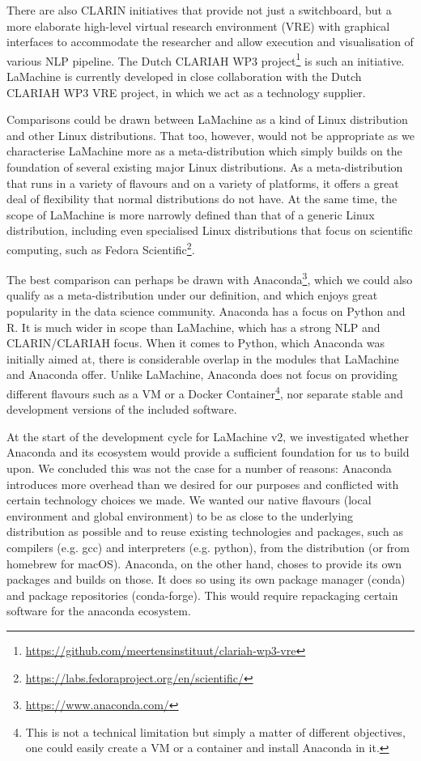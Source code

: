 \documentclass[a4paper,11pt]{article}
\begin{document}
There are also CLARIN initiatives that provide not just a switchboard, but a more elaborate high-level virtual research
environment (VRE) with graphical interfaces to accommodate the researcher and allow execution and visualisation of
various NLP pipeline. The Dutch CLARIAH WP3 project\footnote{\url{https://github.com/meertensinstituut/clariah-wp3-vre}}
is such an initiative. LaMachine is currently developed in
close collaboration with the Dutch CLARIAH WP3 VRE project, in which we act as a technology supplier.

Comparisons could be drawn between LaMachine as a kind of Linux distribution and other Linux distributions. That too,
however, would not be appropriate as we characterise LaMachine more as a meta-distribution which simply builds on the foundation
of several existing major Linux distributions. As a meta-distribution that runs in a variety of flavours and on a
variety of platforms, it offers a great deal of flexibility that normal distributions do not have. At the same time, the scope of
LaMachine is more narrowly defined than that of a generic Linux distribution, including even specialised Linux
distributions that focus on scientific computing, such as Fedora
Scientific\footnote{\url{https://labs.fedoraproject.org/en/scientific/}}.

The best comparison can perhaps be drawn with Anaconda\footnote{\url{https://www.anaconda.com/}}, which we could also qualify as
a meta-distribution under our definition, and which enjoys great popularity in the data science community. Anaconda has
a focus on Python and R. It is much wider in scope than LaMachine, which has a strong NLP and CLARIN/CLARIAH focus. When
it comes to Python, which Anaconda was initially aimed at, there is considerable overlap in the modules that LaMachine and Anaconda offer. Unlike LaMachine,
Anaconda does not focus on providing different flavours such as a VM or a Docker Container\footnote{This is not a
technical limitation but simply a matter of different objectives, one could easily create a VM or a container and
install Anaconda in it.}, nor separate stable and development versions of the included software.

At the start of the development cycle for LaMachine v2, we investigated whether Anaconda and its ecosystem would provide
a sufficient foundation for us to build upon. We concluded this was not the case for a number of reasons: Anaconda
introduces more overhead than we desired for our purposes and conflicted with certain technology choices we made. We
wanted our native flavours (local environment and global environment) to be as close to the underlying distribution as possible and to reuse existing
technologies and packages, such as compilers (e.g. gcc) and
interpreters (e.g. python), from the distribution (or from homebrew for macOS).  Anaconda, on the other hand, choses to provide its own packages and builds on those. It
does so using its own package manager (conda) and package repositories (conda-forge). This would require repackaging certain software for the
anaconda ecosystem.
\end{document}
